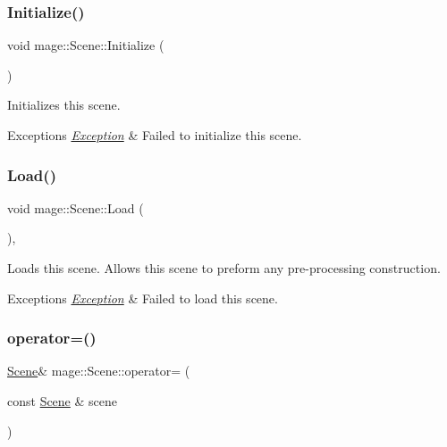 \hypertarget{classmage_1_1_scene_a3cd12ef381ca743bf0b8f8aa2a76eb57}{}\label{classmage_1_1_scene_a3cd12ef381ca743bf0b8f8aa2a76eb57} 
\subsubsection{\texorpdfstring{Initialize()}{Initialize()}}
{\footnotesize\ttfamily void mage\+::\+Scene\+::\+Initialize (\begin{DoxyParamCaption}{ }\end{DoxyParamCaption})}

Initializes this scene.


\begin{DoxyExceptions}{Exceptions}
{\em \hyperlink{classmage_1_1_exception}{Exception}} & Failed to initialize this scene. \\
\hline
\end{DoxyExceptions}
\hypertarget{classmage_1_1_scene_a472443b059c8be0fcd223f6df8378934}{}\label{classmage_1_1_scene_a472443b059c8be0fcd223f6df8378934} 
\subsubsection{\texorpdfstring{Load()}{Load()}}
{\footnotesize\ttfamily void mage\+::\+Scene\+::\+Load (\begin{DoxyParamCaption}{ }\end{DoxyParamCaption})\hspace{0.3cm}{\ttfamily [private]}, {\ttfamily [virtual]}}

Loads this scene. Allows this scene to preform any pre-\/processing construction.


\begin{DoxyExceptions}{Exceptions}
{\em \hyperlink{classmage_1_1_exception}{Exception}} & Failed to load this scene. \\
\hline
\end{DoxyExceptions}
\hypertarget{classmage_1_1_scene_a2c25c0fedc0230771d8c00a8288a69ce}{}\label{classmage_1_1_scene_a2c25c0fedc0230771d8c00a8288a69ce} 
\subsubsection{\texorpdfstring{operator=()}{operator=()}\hspace{0.1cm}{\footnotesize\ttfamily [1/2]}}
{\footnotesize\ttfamily \hyperlink{classmage_1_1_scene}{Scene}\& mage\+::\+Scene\+::operator= (\begin{DoxyParamCaption}\item[{const \hyperlink{classmage_1_1_scene}{Scene} \&}]{scene }\end{DoxyParamCaption})\hspace{0.3cm}{\ttfamily [delete]}}

